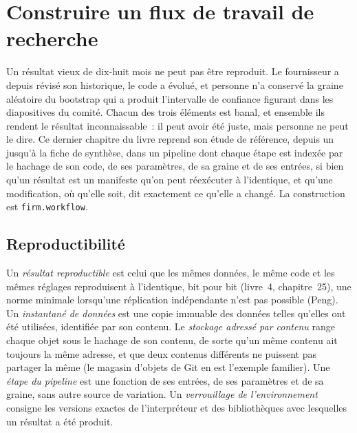\chapter{Construire un flux de travail de recherche}\label{ch:rs:build-a-research-workflow}

Un résultat vieux de dix-huit mois ne peut pas être reproduit. Le fournisseur a depuis révisé son historique, le code a évolué, et personne n'a conservé la graine aléatoire du
bootstrap qui a produit l'intervalle de confiance figurant dans les diapositives du comité. Chacun des trois éléments est banal, et ensemble ils rendent le résultat inconnaissable~: il peut
avoir été juste, mais personne ne peut le dire. Ce dernier chapitre du livre reprend son étude de référence, depuis un  jusqu'à la fiche de synthèse, dans un pipeline dont chaque
étape est indexée par le hachage de son code, de ses paramètres, de sa graine et de ses entrées, si bien qu'un résultat est un manifeste qu'on peut réexécuter à l'identique, et qu'une modification, où qu'elle soit, dit
exactement ce qu'elle a changé. La construction est \texttt{firm.workflow}.

\section{Reproductibilité}

\begin{definition}\label{def:rs:build-a-research-workflow:repro}
Un \emph{résultat reproductible} est celui que les mêmes données, le même code et les mêmes réglages reproduisent à l'identique, bit pour bit (livre~4, chapitre~25), une norme minimale
lorsqu'une réplication indépendante n'est pas possible (Peng). Un \emph{instantané de données} est une copie immuable des données telles qu'elles ont été utilisées, identifiée
par son contenu. Le \emph{stockage adressé par contenu} range chaque objet sous le hachage de son contenu, de sorte qu'un même contenu ait
toujours la même adresse, et que deux contenus différents ne puissent pas partager la même (le magasin d'objets de Git en est l'exemple familier). Une \emph{étape du pipeline} est une fonction de ses
entrées, de ses paramètres et de sa graine, sans autre source de variation. Un \emph{verrouillage de l'environnement} consigne les versions exactes de l'interpréteur
et des bibliothèques avec lesquelles un résultat a été produit.
\end{definition}

